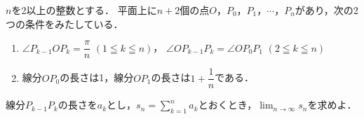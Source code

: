\documentclass[../../main.tex]{subfiles}
\begin{document}
$n$を2以上の整数とする．
平面上に$n+2$個の点$O$，$P_0$，$P_1$，$\cdots$，$P_n$があり，次の2つの条件をみたしている．
\begin{enumerate}
  \item [\ding{"AC}]$\displaystyle \angle P_{k-1}OP_k = \dfrac{\pi}{n}$ $(1 \leqq k \leqq n)$，
    $\angle OP_{k-1}P_k = \angle OP_0P_1$ $(2 \leqq k \leqq n)$
  \item [\ding{"AD}]線分$OP_0$の長さは1，線分$OP_1$の長さは$\displaystyle 1+\dfrac{1}{n}$である．
\end{enumerate}
線分$P_{k-1}P_k$の長さを$a_k$とし，$\displaystyle s_n=\sum_{k=1}^na_k$とおくとき，$\displaystyle\lim_{n\to\infty}s_n$を求めよ．
\end{document}
